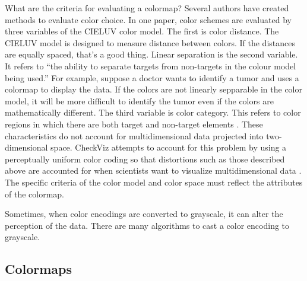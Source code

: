 \documentclass[journal]{IEEEtran}
\begin{document}
\par
What are the criteria for evaluating a colormap? Several authors have created
methods to evaluate color
choice. In one paper, color schemes are evaluated by
three variables of the CIELUV color model. The first
is color distance. The CIELUV model is designed to
measure distance between colors. If the distances are
equally spaced, that’s a good thing. Linear separation
is the second variable. It refers to “the ability to separate targets
from non-targets in the colour model being
used.” For example, suppose a doctor wants to identify
a tumor and uses a colormap to display the data. If the
colors are not linearly sepparable in the color model, it
will be more difficult to identify the tumor even if the
colors are mathematically different. The third variable
is color category. This refers to color regions in which
there are both target and non-target elements \cite{colorchoice}.
 These characteristics do not account for multidimensional data projected into two-dimensional
space. CheckViz attempts to account for this problem
by using a perceptually uniform color coding so that
distortions such as those described above are accounted for when 
scientists want to visualize multidimensional data \cite{checkviz}.
The specific criteria of the color
model and color space must reflect the attributes of the colormap.
\par
Sometimes, when color encodings are converted to
grayscale, it can alter the perception of the data. There
are many algorithms to cast a color encoding to grayscale.

\subsection{Colormaps}
\end{document}

